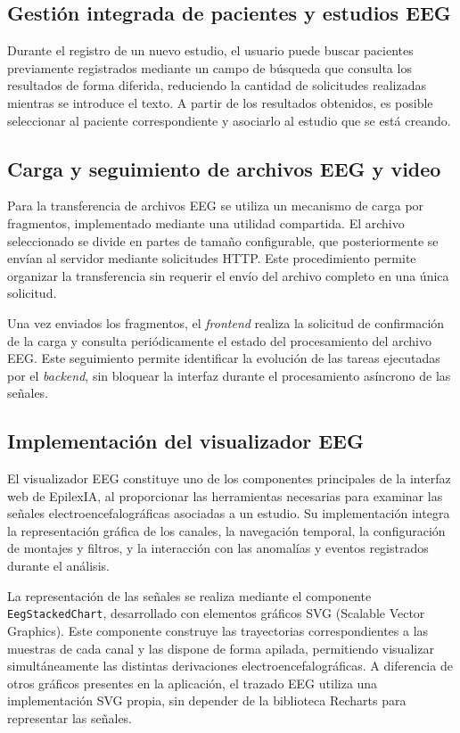 \subsection{Gestión integrada de pacientes y estudios EEG}

Durante el registro de un nuevo estudio,
el usuario puede buscar pacientes previamente
registrados mediante un campo de búsqueda
que consulta los resultados de forma diferida,
reduciendo la cantidad de solicitudes realizadas
mientras se introduce el texto. A partir de
los resultados obtenidos, es posible seleccionar
al paciente correspondiente y asociarlo al
estudio que se está creando.

\subsection{Carga y seguimiento de archivos EEG y video}

Para la transferencia de archivos EEG se
utiliza un mecanismo de carga por fragmentos,
implementado mediante una utilidad compartida.
El archivo seleccionado se divide en partes
de tamaño configurable, que posteriormente
se envían al servidor mediante solicitudes
HTTP. Este procedimiento permite organizar
la transferencia sin requerir el envío
del archivo completo en una única solicitud.

Una vez enviados los fragmentos, el \textit{frontend}
realiza la solicitud de confirmación de la
carga y consulta periódicamente el estado
del procesamiento del archivo EEG. Este
seguimiento permite identificar la evolución
de las tareas ejecutadas por el \textit{backend},
sin bloquear la interfaz durante el
procesamiento asíncrono de las señales.

\subsection{Implementación del visualizador EEG}

El visualizador EEG constituye uno de los
componentes principales de la interfaz web
de EpilexIA, al proporcionar las herramientas
necesarias para examinar las señales
electroencefalográficas asociadas a un estudio.
Su implementación integra la representación
gráfica de los canales, la navegación temporal,
la configuración de montajes y filtros, y
la interacción con las anomalías y eventos
registrados durante el análisis.

La representación de las señales se realiza
mediante el componente \texttt{EegStackedChart},
desarrollado con elementos gráficos SVG
(Scalable Vector Graphics). Este componente
construye las trayectorias correspondientes
a las muestras de cada canal y las dispone
de forma apilada, permitiendo visualizar
simultáneamente las distintas derivaciones
electroencefalográficas. A diferencia de
otros gráficos presentes en la aplicación,
el trazado EEG utiliza una implementación
SVG propia, sin depender de la biblioteca
Recharts para representar las señales.

